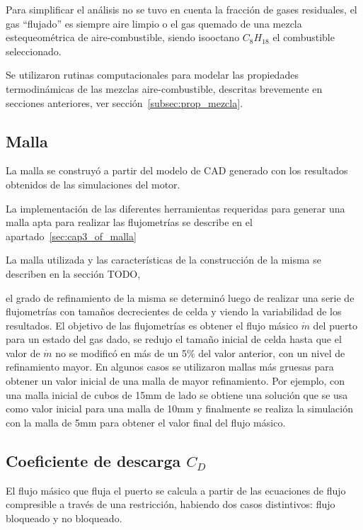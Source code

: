 Para simplificar el análisis no se tuvo en cuenta la fracción de gases
residuales, el gas ``flujado'' es siempre aire limpio o el gas quemado de una
mezcla estequeométrica de aire-combustible, siendo isooctano $C_{8}H_{18}$ el
combustible seleccionado.

Se utilizaron rutinas computacionales para modelar las propiedades
termodinámicas de las mezclas aire-combustible, descritas brevemente en
secciones anteriores, ver sección~\ref{subsec:prop_mezcla}.

\subsection{Malla}

La malla se construyó a partir del modelo de CAD generado con los resultados
obtenidos de las simulaciones del motor.

La implementación de las diferentes herramientas requeridas para generar una malla apta para realizar las flujometrías se describe en el apartado~\ref{sec:cap3_of_malla}

La malla utilizada y las características de la construcción de la misma se
describen en la sección TODO,

el grado de refinamiento de la misma se determinó
luego de realizar una serie de flujometrías con tamaños decrecientes de celda y
viendo la variabilidad de los resultados.
%
El objetivo de las flujometrías es obtener el flujo másico $\dot{m}$ del puerto
para un estado del gas dado, se redujo el tamaño inicial de celda hasta que el
valor de $\dot{m}$ no se modificó en más de un 5\% del valor anterior, con un
nivel de refinamiento mayor.
%
En algunos casos se utilizaron mallas más gruesas para obtener un valor inicial
de una malla de mayor refinamiento.
%
Por ejemplo, con una malla inicial de cubos de 15mm de lado se obtiene una
solución que se usa como valor inicial para una malla de 10mm y finalmente se
realiza la simulación con la malla de 5mm para obtener el valor final del flujo
másico.

\subsection{Coeficiente de descarga $C_{D}$}\label{sec:cap2_cd}

El flujo másico que fluja el puerto se calcula a partir de las ecuaciones de
flujo compresible a través de una restricción, habiendo dos casos distintivos:
flujo bloqueado y no bloqueado.

